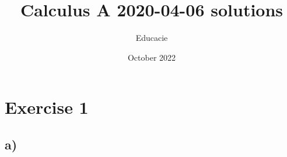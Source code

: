\documentclass{article}
\title{Calculus A 2020-04-06 solutions}
\author{Educacie}
\date{October 2022}
\begin{document}
\maketitle

\section*{Exercise 1}

\subsection{a)}
\end{document}
